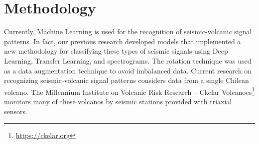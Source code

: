 \documentclass[journal]{IEEEtran}
\begin{document}
\section{Methodology} \label{methodology}
Currently, Machine Learning is used for the recognition of seismic-volcanic signal patterns.
In fact, our previous research developed\cite{mythesismaster,salazar2022multi} models that implemented a new methodology for classifying these types of seismic signals using Deep Learning, Transfer Learning, and spectrograms. The rotation technique was used as a data augmentation technique to avoid imbalanced data.
Current research on recognizing seismic-volcanic signal patterns considers data from a single Chilean volcano. The Millennium Institute on Volcanic Risk Research – Ckelar Volcanoes\footnote{\href{https://ckelar.org}{\color{blue}https://ckelar.org}} monitors many of these volcanos by seismic stations provided with triaxial sensors.
\end{document}
